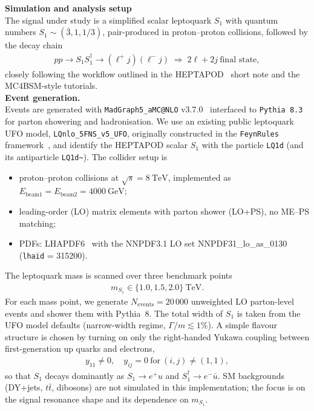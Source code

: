 \documentclass[submission, Phys]{SciPost}
\begin{document}
\begin{promptblock}
\textbf{Simulation and analysis setup}\\
The signal under study is a simplified scalar leptoquark $S_1$ with quantum numbers
$S_1 \sim (\bar{3},1,1/3)$, pair-produced in proton--proton collisions,
followed by the decay chain
%
\begin{align}
  pp \to S_1 S_1^{\dagger} \to (\ell^+ j)(\ell^- j)
  \;
  \Rightarrow \;
  2\ell + 2j~\text{final state},
\end{align}
closely following the workflow outlined in the HEPTAPOD~\cite{Menzo:2025cim} short note and the
MC4BSM-style tutorials.\\

\textbf{Event generation.}\\
Events are generated with \texttt{MadGraph5\_aMC@NLO} v3.7.0~\cite{Alwall:2014hca}
interfaced to \texttt{Pythia~8.3}~\cite{Sjostrand:2014zea} for parton showering and
hadronisation. We use an existing public leptoquark UFO model,
\texttt{LQnlo\_5FNS\_v5\_UFO}, originally constructed in the
\texttt{FeynRules} framework~\cite{Alloul:2013bka}, and identify the HEPTAPOD
scalar $S_1$ with the particle \texttt{LQ1d} (and its antiparticle
\texttt{LQ1d\textasciitilde{}}). The collider setup is
\begin{itemize}
  \item proton--proton collisions at $\sqrt{s} = 8~\text{TeV}$, implemented as
        $E_{\text{beam}1} = E_{\text{beam}2} = 4000~\text{GeV}$;
  \item leading-order (LO) matrix elements with parton shower (LO+PS),
        no ME--PS matching;
  \item PDFs: LHAPDF6~\cite{Buckley:2014ana} with the NNPDF3.1 LO set
        NNPDF31\_lo\_as\_0130~\cite{Ball:2017nwa} (\texttt{lhaid} = 315200).
\end{itemize}

The leptoquark mass is scanned over three benchmark points
%
\begin{align}
  m_{S_1} \in \{1.0, 1.5, 2.0\}~\text{TeV}.
\end{align}
%
For each mass point, we generate $N_{\text{events}} = 20\,000$ unweighted LO
parton-level events and shower them with Pythia~8.  The total width of $S_1$ is
taken from the UFO model defaults (narrow-width regime, $\Gamma/m \lesssim 1\%$).
A simple flavour structure is chosen by turning on only the right-handed
Yukawa coupling between first-generation up quarks and electrons,
%
\begin{align}
  y_{11} \ne 0,\quad y_{ij} = 0~\text{for}~(i,j) \neq (1,1),
\end{align}
%
so that $S_1$ decays dominantly as $S_1 \to e^+ u$ and $S_1^{\dagger} \to e^- \bar u$.
SM backgrounds (DY+jets, $t\bar t$, dibosons) are not simulated in this
implementation; the focus is on the signal resonance shape and its dependence on
$m_{S_1}$.


\end{promptblock}
\end{document}
